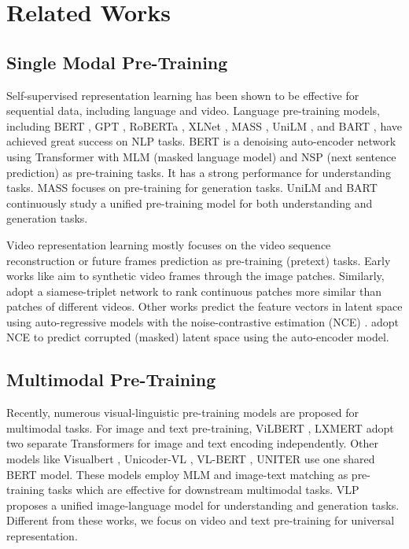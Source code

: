 \documentclass[11pt,a4paper]{article}
\begin{document}
	\section{Related Works}
	\subsection{Single Modal Pre-Training}
	Self-supervised representation learning has been shown to be effective for sequential data, including language and video. Language pre-training models, including BERT \cite{devlin2019bert}, GPT \cite{radford2018improving}, RoBERTa \cite{liu2019roberta}, XLNet \cite{yang2019xlnet}, MASS \cite{song2019mass}, UniLM \cite{dong2019unified}, and BART \cite{lewis2019bart}, have achieved great success on NLP tasks. BERT \cite{devlin2019bert} is a denoising auto-encoder network using Transformer with MLM (masked language model) and NSP (next sentence prediction) as pre-training tasks. It has a strong performance for understanding tasks. MASS \cite{song2019mass} focuses on pre-training for generation tasks. UniLM \cite{dong2019unified} and BART \cite{lewis2019bart} continuously study a unified pre-training model for both understanding and generation tasks.
	
	Video representation learning mostly focuses on the video sequence reconstruction or future frames prediction as pre-training (pretext) tasks. Early works like \cite{mathieu2015deep,srivastava2015unsupervised,han2019video} aim to synthetic video frames through the image patches. Similarly, \citet{wang2015unsupervised} adopt a siamese-triplet network to rank continuous patches more similar than patches of different videos. Other works predict the feature vectors in latent space using auto-regressive models with the noise-contrastive estimation (NCE) \cite{lotter2016deep,oord2018representation}. \citet{sun2019contrastive} adopt NCE to predict corrupted (masked) latent space using the auto-encoder model.
	
	\subsection{Multimodal Pre-Training}
	Recently, numerous visual-linguistic pre-training models are proposed for multimodal tasks. For image and text pre-training, ViLBERT \cite{lu2019vilbert}, LXMERT \cite{tan2019lxmert} adopt two separate Transformers for image and text encoding independently. Other models like Visualbert \cite{li2019visualbert}, Unicoder-VL \cite{li2019unicoder}, VL-BERT \cite{Su2020VLBERT}, UNITER \cite{zhou2019unified} use one shared BERT model. These models employ MLM and image-text matching as pre-training tasks which are effective for downstream multimodal tasks. VLP \cite{zhou2019unified} proposes a unified image-language model for understanding and generation tasks. Different from these works, we focus on video and text pre-training for universal representation.
	
\end{document}
